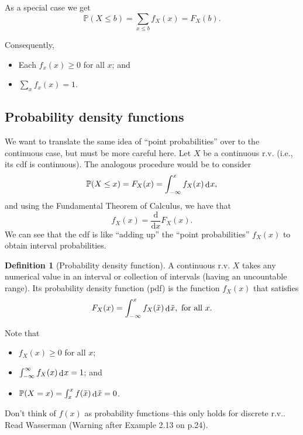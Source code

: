 \documentclass[
]{book}
\providecommand{\tightlist}{%
  \setlength{\itemsep}{0pt}\setlength{\parskip}{0pt}}
\newcommand{\bbP}{\mathbb{P}}
\DeclareMathOperator{\dd}{d}
\newcommand{\dint}{\dd\hspace{0.5pt}\!}
\newcommand{\ddif}{\text{d}}
\theoremstyle{definition}
\newtheorem{definition}{Definition}[chapter]
\theoremstyle{definition}
\theoremstyle{definition}
\theoremstyle{definition}
\theoremstyle{remark}
\begin{document}
As a special case we get
\[
  \bbP(X \leq b) = \sum_{x\leq b} f_X(x) = F_X(b).
\]

Consequently,

\begin{itemize}
\tightlist
\item
  Each \(f_x(x) \geq 0\) for all \(x\); and
\item
  \(\sum_{x} f_x(x) = 1\).
\end{itemize}

\hypertarget{probability-density-functions}{%
\subsection{Probability density functions}\label{probability-density-functions}}

We want to translate the same idea of ``point probabilities'' over to the continuous case, but must be more careful here.
Let \(X\) be a continuous r.v. (i.e., its cdf is continuous).
The analogous procedure would be to consider
\[
  \bbP(X \leq x) = F_X(x) = \int_{-\infty}^x f_X(x) \dint x,
\]
and using the Fundamental Theorem of Calculus, we have that
\[
  f_X(x) = \frac{\ddif}{\ddif x}F_X(x).
\]
We can see that the cdf is like ``adding up'' the ``point probabilities'' \(f_X(x)\) to obtain interval probabilities.

\begin{definition}[Probability density function]
A continuous r.v. \(X\) takes any numerical value in an interval or collection of intervals (having an uncountable range).
Its probability density function (pdf) is the function \(f_X(x)\) that satisfies
\[
F_X(x) = \int_{-\infty}^x f_X(\tilde x) \dint \tilde x, \text{ for all } x.
\]
\end{definition}

Note that

\begin{itemize}
\tightlist
\item
  \(f_X(x) \geq 0\) for all \(x\);
\item
  \(\int_{-\infty}^\infty f_X(x) \dint x = 1\); and
\item
  \(\bbP(X=x) = \int_x^x f(\tilde x) \dint \tilde x = 0\).
\end{itemize}

Don't think of \(f(x)\) as probability functions--this only holds for discrete r.v..
Read Wasserman (Warning after Example 2.13 on p.24).
\end{document}
